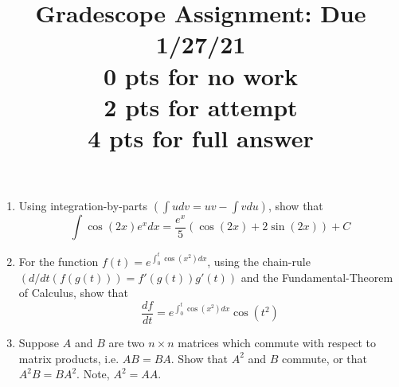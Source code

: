 \documentclass[a4paper,11pt]{article}
\title{Gradescope Assignment: Due 1/27/21\\
0 pts for no work\\ 2 pts for attempt\\ 4 pts for full answer}
\date{}
\begin{document}
\maketitle
\begin{enumerate}
\item Using integration-by-parts $\left(\int udv = uv - \int vdu \right)$, show that 
\[
\int \cos(2x) e^{x}dx = \frac{e^{x}}{5}\left(\cos(2x) + 2\sin(2x) \right) + C
\]
\item For the function $f(t) = e^{\int_{0}^{t}\cos(x^2 )dx}$, using the chain-rule $\left(d/dt(f(g(t)))=f'(g(t))g'(t)\right)$ and the Fundamental-Theorem of Calculus, show that 
\[
\frac{df}{dt} = e^{\int_{0}^{t}\cos(x^{2})dx}\cos(t^{2})
\] 
\item Suppose $A$ and $B$ are two $n\times n$ matrices which commute with respect to matrix products, i.e. $AB=BA$.  Show that $A^{2}$ and $B$ commute, or that $A^{2}B=BA^{2}$.  Note, $A^{2}=AA$.
\end{enumerate}
\end{document}
